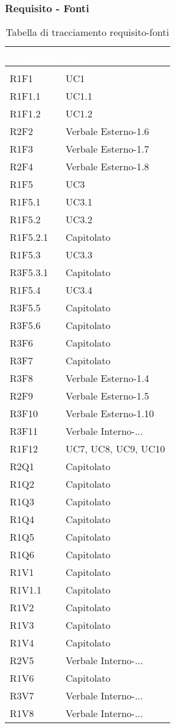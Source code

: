 \subsubsection{Requisito - Fonti}
\renewcommand{\arraystretch}{1.5}
\begin{center}
\begin{longtable}{C{6cm} C{6cm}}
		\textcolor{white}{\textbf{Requisito}} & 
		\textcolor{white}{\textbf{Fonti}}\\
		\endfirsthead
	    \\
	    \endfoot
	    \caption{Tabella di tracciamento requisito-fonti}
	    \endlastfoot


R1F1 & UC1 \\
R1F1.1 & UC1.1 \\
R1F1.2 & UC1.2 \\
R2F2 & Verbale Esterno-1.6 \\
R1F3 & Verbale Esterno-1.7 \\
R2F4 & Verbale Esterno-1.8 \\
R1F5 & UC3 \\
R1F5.1 & UC3.1 \\
R1F5.2 & UC3.2 \\
R1F5.2.1 & Capitolato \\
R1F5.3 & UC3.3 \\
R3F5.3.1 & Capitolato \\
R1F5.4 & UC3.4 \\
R3F5.5 & Capitolato \\
R3F5.6 & Capitolato \\
R3F6 & Capitolato \\
R3F7 & Capitolato \\
R3F8 & Verbale Esterno-1.4 \\
R2F9 & Verbale Esterno-1.5 \\
R3F10 & Verbale Esterno-1.10 \\
R3F11 & Verbale Interno-... \\
R1F12 & UC7, UC8, UC9, UC10 \\
R2Q1 & Capitolato \\
R1Q2 & Capitolato \\
R1Q3 & Capitolato \\
R1Q4 & Capitolato \\
R1Q5 & Capitolato \\
R1Q6 & Capitolato \\
R1V1 & Capitolato \\
R1V1.1 & Capitolato \\
R1V2 & Capitolato \\
R1V3 & Capitolato \\
R1V4 & Capitolato \\
R2V5 & Verbale Interno-... \\
R1V6 & Capitolato \\
R3V7 & Verbale Interno-... \\
R1V8 & Verbale Interno-... \\

\end{longtable}
\end{center}